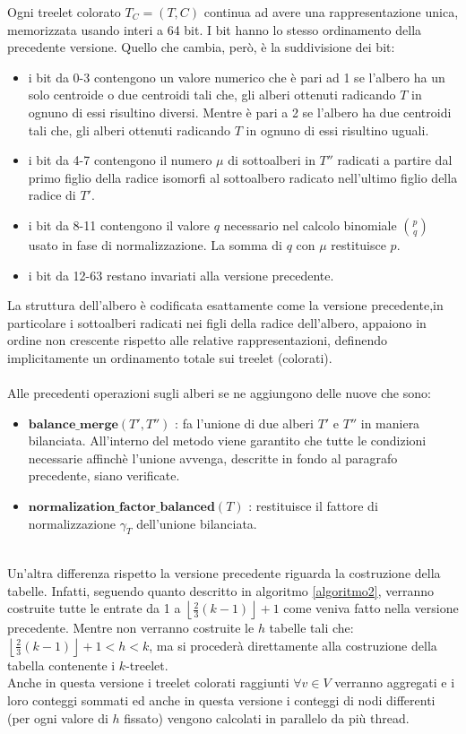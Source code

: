 Ogni treelet colorato $ T_C = (T,C)$ continua ad avere una rappresentazione unica, memorizzata usando interi a 64 bit.
I bit hanno lo stesso ordinamento della precedente versione.
Quello che cambia, per\`o, \`e la suddivisione dei bit:
\begin{itemize}
	\item i bit da 0-3 contengono un valore numerico che \`e pari ad 1 se l'albero ha un solo centroide o due centroidi tali che, gli alberi ottenuti radicando $ T $ in ognuno di essi risultino diversi.
	Mentre \`e pari a  2 se l'albero ha due centroidi tali che, gli alberi ottenuti radicando $ T $ in ognuno di essi risultino uguali.
	\item  i bit da 4-7 contengono il numero $\mu$ di sottoalberi in $ T'' $ radicati a partire dal primo figlio della radice isomorfi al sottoalbero radicato nell'ultimo figlio della radice di $ T' $.
	\item i bit da 8-11 contengono il valore $ q $ necessario nel calcolo binomiale $ \binom{p}{q} $ usato in fase di normalizzazione.
	La somma di $ q $ con $\mu$ restituisce $ p $.
	\item i bit da 12-63 restano invariati alla versione precedente.	  
\end{itemize} 

La struttura dell'albero \`e codificata esattamente come la versione precedente,in particolare i sottoalberi radicati nei figli della radice dell'albero, appaiono in ordine non crescente rispetto alle relative rappresentazioni, definendo implicitamente un ordinamento totale sui treelet (colorati).\\\\
Alle precedenti operazioni sugli alberi se ne aggiungono delle nuove che sono:
\begin{itemize}
	\item $ \textbf{balance\_merge}(T',T'') $ : fa l'unione di due alberi $ T' $ e $ T'' $ in maniera bilanciata.
	All'interno del metodo viene garantito che tutte le condizioni necessarie affinch\`e l'unione avvenga, descritte in fondo al paragrafo precedente, siano verificate.
	\item $ \textbf{normalization\_factor\_balanced}(T) $ : restituisce il fattore di normalizzazione $ \gamma_T $ dell'unione bilanciata.
\end{itemize}\mbox{}\\
Un'altra differenza rispetto la versione precedente riguarda la costruzione della tabelle.
Infatti, seguendo quanto descritto in algoritmo \ref{algoritmo2}, verranno costruite tutte le entrate da 1 a  $ \left\lfloor \frac{2}{3}(k-1) \right\rfloor +1 $ come veniva fatto nella versione precedente.
Mentre non verranno costruite le $ h $ tabelle tali che: $ \left\lfloor \frac{2}{3}(k-1) \right\rfloor +1 < h < k $, ma si proceder\`a direttamente alla costruzione della tabella contenente i $ k $-treelet.\\
Anche in questa versione i treelet colorati raggiunti $ \forall v \in V $ verranno aggregati e i loro conteggi sommati ed anche in questa versione i conteggi di nodi differenti  (per ogni valore di $ h $ fissato) vengono calcolati in parallelo da pi\`u thread.